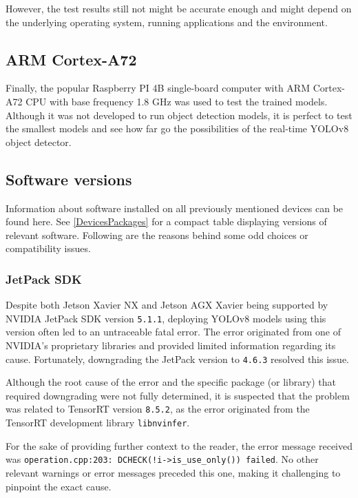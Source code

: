 However, the test results still not might be accurate enough and might depend on
the underlying operating system, running applications and the environment.


\subsection{ARM Cortex-A72}

Finally, the popular Raspberry PI 4B single-board computer with ARM Cortex-A72
CPU with base frequency 1.8 GHz was used to test the trained models. Although it
was not developed to run object detection models, it is perfect to test the
smallest models and see how far go the possibilities of the real-time YOLOv8
object detector.


\subsection{Software versions}

Information about software installed on all previously mentioned devices can be
found here. See \autoref{DevicesPackages} for a compact table displaying
versions of relevant software. Following are the reasons behind some odd choices
or compatibility issues.


\subsubsection*{JetPack SDK}

Despite both Jetson Xavier NX and Jetson AGX Xavier being supported by NVIDIA
JetPack SDK version \texttt{5.1.1}, deploying YOLOv8 models using this version
often led to an untraceable fatal error. The error originated from one of
NVIDIA's proprietary libraries and provided limited information regarding its
cause.  Fortunately, downgrading the JetPack version to \texttt{4.6.3} resolved
this issue.

Although the root cause of the error and the specific package (or library) that
required downgrading were not fully determined, it is suspected that the problem
was related to TensorRT version \texttt{8.5.2}, as the error originated from the
TensorRT development library \texttt{libnvinfer}.

For the sake of providing further context to the reader, the error message
received was \verb|operation.cpp:203: DCHECK(!i->is_use_only()) failed|. No
other relevant warnings or error messages preceded this one, making it
challenging to pinpoint the exact cause.


